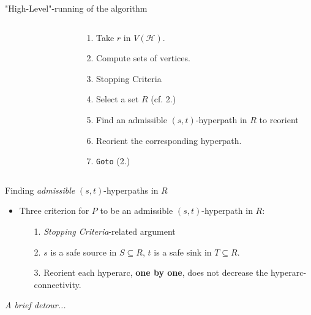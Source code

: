 \documentclass[10pt, aspectratio=43,compress]{beamer}
\begin{document}
\begin{frame}{"High-Level"-running of the algorithm}
\begin{columns}
\begin{column}{0.5\textwidth}
\begin{figure}[H]
\begin{tikzpicture}
					\end{tikzpicture}
				\end{figure}
			\end{column}
			\hfill
			\begin{column}{0.5\textwidth}
				\begin{enumerate}
					\item <alert@2> Take $r$ in $V(\mathcal{H})$.
					\item <alert@3,9,15,25> Compute sets of vertices.
					\item <alert@4,10,16,26> Stopping Criteria
					\item <alert@5,11,17> Select a set $R$ (cf. 2.)
					\item <alert@6,12,18> Find an admissible $(s, t)$-hyperpath in $R$ to reorient
					\item <alert@7,13,19-23> Reorient the corresponding hyperpath.
					\item <alert@8,14,24> \texttt{Goto} (2.)
				\end{enumerate}
			\end{column}
		\end{columns}	
	\end{frame}

	\begin{frame}{Finding \textit{admissible} $(s, t)$-hyperpaths in $R$}

		\begin{tcolorbox}[colback=darkseagreen!5!white,colframe=darkseagreen!75!black,title=Admissible hyperpaths]
			\begin{itemize}[<+->]
				\item Three criterion for $P$ to be an admissible $(s, t)$-hyperpath in $R$:
				\begin{itemize}
					\item[1.] \textit{Stopping Criteria}-related argument
					\item[2.] $s$ is a {\color{alizarin}safe source} in $S\subseteq{R}$, $t$ is a {\color{alizarin}safe sink} in $T\subseteq{R}$.
					\item[3.] Reorient each hyperarc, \textbf{one by one}, does not decrease the hyperarc-connectivity.
				\end{itemize}
			\end{itemize}
		\end{tcolorbox}

		\begin{flushright}
			\textit{A brief detour...}
		\end{flushright}
	\end{frame}
\end{document}
